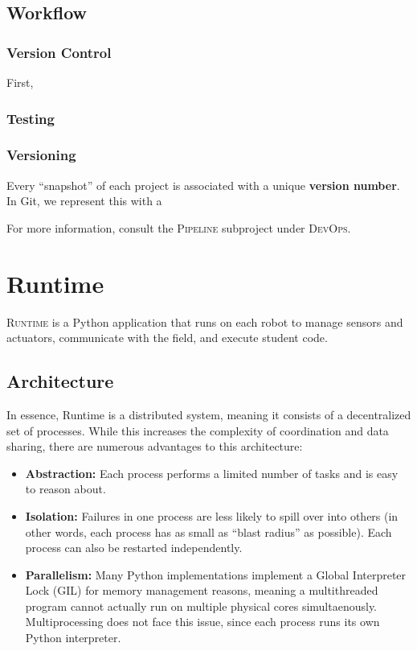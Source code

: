 \documentclass[12pt]{book}
\begin{document}
  \section{Workflow}

  \subsection{Version Control}

  First,

  \subsection{Testing}

  \subsection{Versioning}

  Every ``snapshot'' of each project is associated with a unique \textbf{version number}.
  In Git, we represent this with a

  For more information, consult the \textsc{Pipeline} subproject under \textsc{DevOps}.

  \chapter{Runtime}

  \textsc{Runtime} is a Python application that runs on each robot to manage sensors and actuators, communicate with the field, and execute student code.

  \section{Architecture}

  In essence, Runtime is a distributed system, meaning it consists of a decentralized set of processes.
  While this increases the complexity of coordination and data sharing, there are numerous advantages to this architecture:
  \begin{itemize}
  \item
    \textbf{Abstraction:} Each process performs a limited number of tasks and is easy to reason about.
  \item
    \textbf{Isolation:} Failures in one process are less likely to spill over into others (in other words, each process has as small as ``blast radius'' as possible).
    Each process can also be restarted independently.
  \item
    \textbf{Parallelism:} Many Python implementations implement a Global Interpreter Lock (GIL) for memory management reasons, meaning a multithreaded program cannot actually run on multiple physical cores simultaenously.
    Multiprocessing does not face this issue, since each process runs its own Python interpreter.
  \end{itemize}
\end{document}
